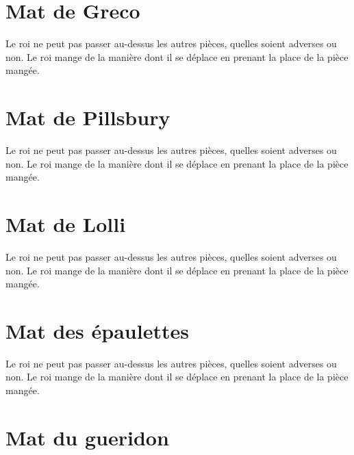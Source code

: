 \documentclass[a5paper,openany,twocolumn]{book}
\begin{document}
{%

\chapter{Mat de Greco}
 
Le roi ne peut pas passer au-dessus les autres pièces, quelles soient adverses ou non. Le roi mange de la manière dont il se déplace en prenant la place de la pièce mangée. 


\chapter{Mat de Pillsbury}

Le roi ne peut pas passer au-dessus les autres pièces, quelles soient adverses ou non. Le roi mange de la manière dont il se déplace en prenant la place de la pièce mangée. 


\chapter{Mat de Lolli}

Le roi ne peut pas passer au-dessus les autres pièces, quelles soient adverses ou non. Le roi mange de la manière dont il se déplace en prenant la place de la pièce mangée. 


\chapter{Mat des épaulettes}
 
Le roi ne peut pas passer au-dessus les autres pièces, quelles soient adverses ou non. Le roi mange de la manière dont il se déplace en prenant la place de la pièce mangée. 


\chapter{Mat du gueridon}

}
\end{document}
